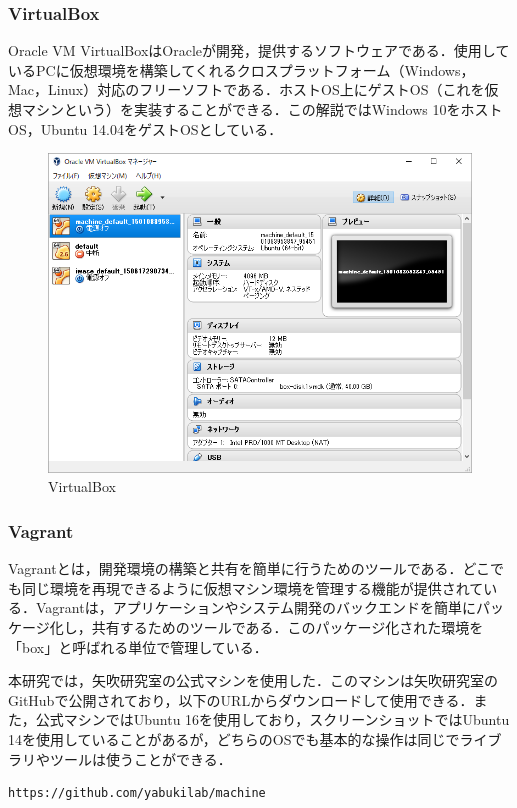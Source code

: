 \subsubsection{VirtualBox}
Oracle VM VirtualBoxはOracleが開発，提供するソフトウェアである．使用しているPCに仮想環境を構築してくれるクロスプラットフォーム（Windows，Mac，Linux）対応のフリーソフトである．ホストOS上にゲストOS（これを仮想マシンという）を実装することができる．この解説ではWindows 10をホストOS，Ubuntu 14.04をゲストOSとしている．
\begin{figure}[htb]
\centering
\includegraphics[width=13cm]{img/box.png}
\caption{VirtualBox}
\end{figure}

\newpage
\subsubsection{Vagrant}
Vagrantとは，開発環境の構築と共有を簡単に行うためのツールである．どこでも同じ環境を再現できるように仮想マシン環境を管理する機能が提供されている．Vagrantは，アプリケーションやシステム開発のバックエンドを簡単にパッケージ化し，共有するためのツールである．このパッケージ化された環境を「box」と呼ばれる単位で管理している．

本研究では，矢吹研究室の公式マシンを使用した．このマシンは矢吹研究室のGitHubで公開されており，以下のURLからダウンロードして使用できる．また，公式マシンではUbuntu 16を使用しており，スクリーンショットではUbuntu 14を使用していることがあるが，どちらのOSでも基本的な操作は同じでライブラリやツールは使うことができる．

\begin{verbatim}
https://github.com/yabukilab/machine
\end{verbatim}

